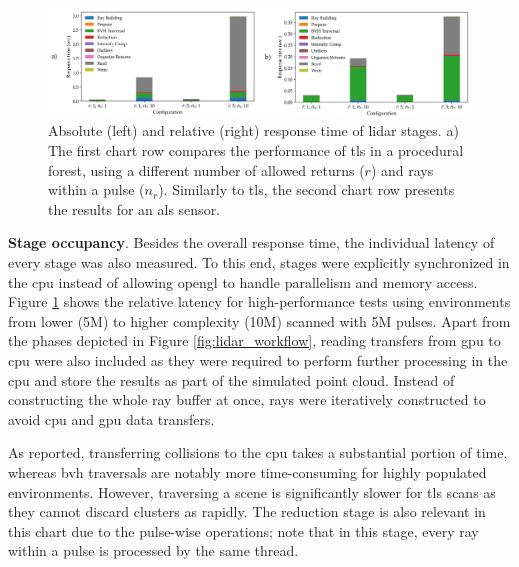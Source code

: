 \begin{figure}
    \centering
    \includegraphics[width=\linewidth]{figs/lidar_simulation/lidar_response_time_stage.png}
	\caption{Absolute (left) and relative (right) response time of \acrshort{lidar} stages. a) The first chart row compares the performance of \acrshort{tls} in a procedural forest, using a different number of allowed returns ($r$) and rays within a pulse ($n_r$). Similarly to \acrshort{tls}, the second chart row presents the results for an \acrshort{als} sensor.}
	\label{fig:lidar_response_time_chart}
\end{figure}

\textbf{Stage occupancy}. Besides the overall response time, the individual latency of every stage was also measured. To this end, stages were explicitly synchronized in the \acrshort{cpu} instead of allowing \acrshort{opengl} to handle parallelism and memory access. Figure \ref{fig:lidar_response_time_chart} shows the relative latency for high-performance tests using environments from lower (5M) to higher complexity (10M) scanned with 5M pulses. Apart from the phases depicted in Figure \ref{fig:lidar_workflow}, reading transfers from \acrshort{gpu} to \acrshort{cpu} were also included as they were required to perform further processing in the \acrshort{cpu} and store the results as part of the simulated point cloud. Instead of constructing the whole ray buffer at once, rays were iteratively constructed to avoid \acrshort{cpu} and \acrshort{gpu} data transfers.

As reported, transferring collisions to the \acrshort{cpu} takes a substantial portion of time, whereas \acrshort{bvh} traversals are notably more time-consuming for highly populated environments. However, traversing a scene is significantly slower for \acrshort{tls} scans as they cannot discard clusters as rapidly. The reduction stage is also relevant in this chart due to the pulse-wise operations; note that in this stage, every ray within a pulse is processed by the same thread. 

\newcommand{\datasetImageHeight}{-.06\totalheight}
\newcommand{\datasetImageSize}{1.4cm}
\newcommand{\lidarCoreLabel}{ToF Solver}

